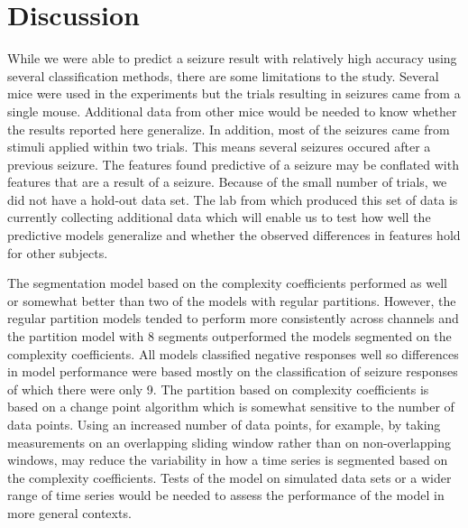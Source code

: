 \section{Discussion} 

While we were able to predict a seizure result 
with relatively high accuracy using several 
classification methods, there are some 
limitations to the study. Several mice 
were used in the experiments but the 
trials resulting in seizures came from a single mouse. 
Additional data from other mice would be needed 
to know whether the results reported here generalize. 
In addition, most of the seizures 
came from stimuli applied within two trials. This means
several seizures occured after a previous seizure. 
The features found predictive of a seizure may  
be conflated with features that are a result of a seizure. 
Because of the small number of trials, we did not 
have a hold-out data set. The lab from which produced this 
set of data is currently collecting additional data which will 
enable us to test how well the predictive models generalize 
and whether the observed differences in features hold for other 
subjects. 

The segmentation model based on the complexity coefficients performed as well or somewhat better than two of the models with regular partitions. However, the regular partition models tended to perform more consistently across channels and the partition model with 8 segments outperformed the models segmented on the complexity coefficients. All models classified negative responses well so differences in model performance were based
mostly on the classification of seizure responses of which there were only 9. The partition based on complexity coefficients is based on a change point algorithm which is somewhat sensitive to the number of data points. Using an increased number of data points, 
for example, by taking measurements on an overlapping sliding window rather than on non-overlapping windows, may reduce the variability in how a time series is segmented based on the complexity coefficients. Tests of the model on simulated data sets or a wider range of time series would be needed to assess the performance of the model in more general contexts. 








